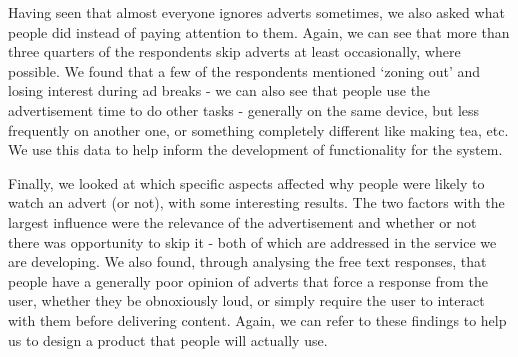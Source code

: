 Having seen that almost everyone ignores adverts sometimes, we also asked what people did instead of paying attention to them. Again, we can see that more than three quarters of the respondents skip adverts at least occasionally, where possible. We found that a few of the respondents mentioned `zoning out' and losing interest during ad breaks - we can also see that people use the advertisement time to do other tasks - generally on the same device, but less frequently on another one, or something completely different like making tea, etc. We use this data to help inform the development of functionality for the system.

Finally, we looked at which specific aspects affected why people were likely to watch an advert (or not), with some interesting results. The two factors with the largest influence were the relevance of the advertisement and whether or not there was opportunity to skip it - both of which are addressed in the service we are developing. We also found, through analysing the free text responses, that people have a generally poor opinion of adverts that force a response from the user, whether they be obnoxiously loud, or simply require the user to interact with them before delivering content. Again, we can refer to these findings to help us to design a product that people will actually use. 
